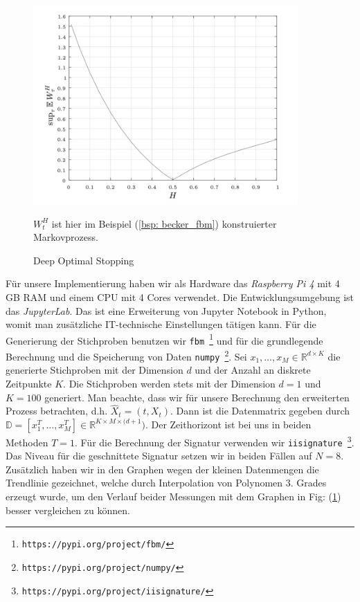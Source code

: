 \documentclass[12pt,titlepage,headsepline]{article}
\begin{document}
      \begin{figure}[H]
        \caption{Deep Optimal Stopping \cite{becker_deep_2019}}
        \centering
        \includegraphics[width=0.9\textwidth]{becker_expec_vs_hurst.jpg}
        {\footnotesize
        \hfill\break
        $W_t^H$ ist hier im Beispiel (\ref{bsp: becker_fbm}) konstruierter Markovprozess.
        \par}
        \label{fig: becker_expec_vs_hurst}
      \end{figure}
      \hfill\break
      Für unsere Implementierung haben wir als Hardware das \textit{Raspberry Pi 4} mit 4 GB RAM und einem CPU mit 4 Cores verwendet. Die Entwicklungsumgebung ist das \textit{JupyterLab}. Das ist eine Erweiterung von Jupyter Notebook in Python, womit man zusätzliche IT-technische Einstellungen tätigen kann. Für die Generierung der Stichproben benutzen wir \texttt{fbm \footnote{https://pypi.org/project/fbm/}} und für die grundlegende Berechnung und die Speicherung von Daten \texttt{numpy \footnote{https://pypi.org/project/numpy/}}.
      \hfill\break
      Sei $x_1,\ldots,x_M \in \mathbb{R}^{d \times K}$ die generierte Stichproben mit der Dimension $d$ und der Anzahl an diskrete Zeitpunkte $K$. Die Stichproben werden stets mit der Dimension $d=1$ und $K=100$ generiert. Man beachte, dass wir für unsere Berechnung den erweiterten Prozess betrachten, d.h. $\hat{X}_t = (t,X_t)$. Dann ist die Datenmatrix gegeben durch
      $\mathbb{D} = [x_1^T,\ldots,x_M^T] \in \mathbb{R}^{K \times M \times ({d+1}})$. Der Zeithorizont ist bei uns in beiden Methoden $T=1$. Für die Berechnung der Signatur verwenden wir \texttt{iisignature \footnote{https://pypi.org/project/iisignature/}}. Das Niveau für die geschnittete Signatur setzen wir in beiden Fällen auf $N=8$. Zusätzlich haben wir in den Graphen wegen der kleinen Datenmengen die Trendlinie gezeichnet, welche durch Interpolation von Polynomen $3.$ Grades erzeugt wurde, um den Verlauf beider Messungen mit dem Graphen in Fig: (\ref{fig: becker_expec_vs_hurst}) besser vergleichen zu können.
\end{document}
